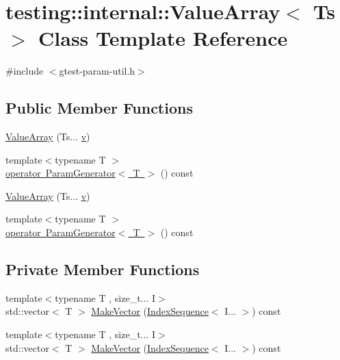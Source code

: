 \hypertarget{classtesting_1_1internal_1_1_value_array}{}\section{testing\+::internal\+::Value\+Array$<$ Ts $>$ Class Template Reference}
\label{classtesting_1_1internal_1_1_value_array}


{\ttfamily \#include $<$gtest-\/param-\/util.\+h$>$}

\subsection*{Public Member Functions}
\begin{DoxyCompactItemize}
\item 
\mbox{\hyperlink{classtesting_1_1internal_1_1_value_array_acd7cd6a969a7e95152eac1787c42c9ed}{Value\+Array}} (Ts... \mbox{\hyperlink{_important_values_8h_aaad811047eb9ea3edb6ec2bbeddb2b2b}{v}})
\item 
{\footnotesize template$<$typename T $>$ }\\\mbox{\hyperlink{classtesting_1_1internal_1_1_value_array_a019560f10debdce5f47bb18c0e5261b5}{operator Param\+Generator$<$ T $>$}} () const
\item 
\mbox{\hyperlink{classtesting_1_1internal_1_1_value_array_acd7cd6a969a7e95152eac1787c42c9ed}{Value\+Array}} (Ts... \mbox{\hyperlink{_important_values_8h_aaad811047eb9ea3edb6ec2bbeddb2b2b}{v}})
\item 
{\footnotesize template$<$typename T $>$ }\\\mbox{\hyperlink{classtesting_1_1internal_1_1_value_array_a019560f10debdce5f47bb18c0e5261b5}{operator Param\+Generator$<$ T $>$}} () const
\end{DoxyCompactItemize}
\subsection*{Private Member Functions}
\begin{DoxyCompactItemize}
\item 
{\footnotesize template$<$typename T , size\+\_\+t... I$>$ }\\std\+::vector$<$ T $>$ \mbox{\hyperlink{classtesting_1_1internal_1_1_value_array_a738073a57459083586285f5055aeac19}{Make\+Vector}} (\mbox{\hyperlink{structtesting_1_1internal_1_1_index_sequence}{Index\+Sequence}}$<$ I... $>$) const
\item 
{\footnotesize template$<$typename T , size\+\_\+t... I$>$ }\\std\+::vector$<$ T $>$ \mbox{\hyperlink{classtesting_1_1internal_1_1_value_array_a738073a57459083586285f5055aeac19}{Make\+Vector}} (\mbox{\hyperlink{structtesting_1_1internal_1_1_index_sequence}{Index\+Sequence}}$<$ I... $>$) const
\end{DoxyCompactItemize}
